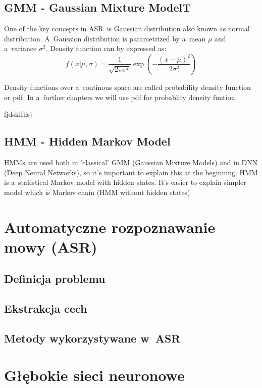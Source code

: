 \documentclass[a4paper]{report}
\theoremstyle{definition}
\begin{document}
\section{GMM - Gaussian Mixture ModelT}

One of the key concepts in ASR~is Gaussian distribution also known as normal distribution. A~Gaussion distribution is parametrized by a~mean $\mu $ and a~variance $\sigma ^ 2$. Density function can by expressed as:
\begin{equation}
	f(x|\mu,\sigma) = \frac {1}{\sqrt{2\pi\sigma^2}}\exp(-\frac{(x-\mu)^2}{2\sigma ^ 2})
	\label{Gaussion Distribution}
\end{equation}

Density functions over a~continous space are called probability density function or pdf. In a~further chapters we will use pdf for probablity density funtion.

fjdsklfjlsj

\section{HMM - Hidden Markov Model}

HMMs are used both in 'classical' GMM (Gaussian Mixture Models) and in DNN (Deep Neural Networks), so it's important to explain this at the beginning. HMM is a~statistical Markov model with hidden states. It's easier to explain simpler model which is Markov chain (HMM without hidden states)



\chapter{Automatyczne rozpoznawanie mowy (ASR)}
\section{Definicja problemu}
\section{Ekstrakcja cech}
\section{Metody wykorzystywane w~ASR}

\chapter{Głębokie sieci neuronowe}
\end{document}
